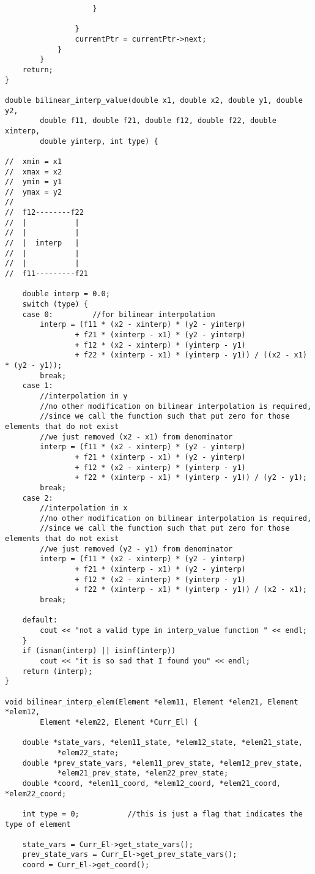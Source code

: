 \documentclass[a4paper,10pt]{article}
\begin{document}
\begin{lstlisting}
					}

				}
				currentPtr = currentPtr->next;
			}
		}
	return;
}

double bilinear_interp_value(double x1, double x2, double y1, double y2,
		double f11, double f21, double f12, double f22, double xinterp,
		double yinterp, int type) {

//	xmin = x1
//	xmax = x2
//	ymin = y1
//	ymax = y2
//
//	f12--------f22
//	|           |
//	|           |
//	|  interp   |
//	|           |
//	|           |
//	f11---------f21

	double interp = 0.0;
	switch (type) {
	case 0:			//for bilinear interpolation
		interp = (f11 * (x2 - xinterp) * (y2 - yinterp)
				+ f21 * (xinterp - x1) * (y2 - yinterp)
				+ f12 * (x2 - xinterp) * (yinterp - y1)
				+ f22 * (xinterp - x1) * (yinterp - y1)) / ((x2 - x1) * (y2 - y1));
		break;
	case 1:
		//interpolation in y
		//no other modification on bilinear interpolation is required,
		//since we call the function such that put zero for those elements that do not exist
		//we just removed (x2 - x1) from denominator
		interp = (f11 * (x2 - xinterp) * (y2 - yinterp)
				+ f21 * (xinterp - x1) * (y2 - yinterp)
				+ f12 * (x2 - xinterp) * (yinterp - y1)
				+ f22 * (xinterp - x1) * (yinterp - y1)) / (y2 - y1);
		break;
	case 2:
		//interpolation in x
		//no other modification on bilinear interpolation is required,
		//since we call the function such that put zero for those elements that do not exist
		//we just removed (y2 - y1) from denominator
		interp = (f11 * (x2 - xinterp) * (y2 - yinterp)
				+ f21 * (xinterp - x1) * (y2 - yinterp)
				+ f12 * (x2 - xinterp) * (yinterp - y1)
				+ f22 * (xinterp - x1) * (yinterp - y1)) / (x2 - x1);
		break;

	default:
		cout << "not a valid type in interp_value function " << endl;
	}
	if (isnan(interp) || isinf(interp))
		cout << "it is so sad that I found you" << endl;
	return (interp);
}

void bilinear_interp_elem(Element *elem11, Element *elem21, Element *elem12,
		Element *elem22, Element *Curr_El) {

	double *state_vars, *elem11_state, *elem12_state, *elem21_state,
			*elem22_state;
	double *prev_state_vars, *elem11_prev_state, *elem12_prev_state,
			*elem21_prev_state, *elem22_prev_state;
	double *coord, *elem11_coord, *elem12_coord, *elem21_coord, *elem22_coord;

	int type = 0;			//this is just a flag that indicates the type of element

	state_vars = Curr_El->get_state_vars();
	prev_state_vars = Curr_El->get_prev_state_vars();
	coord = Curr_El->get_coord();


\end{lstlisting}
\end{document}

